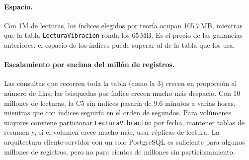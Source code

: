 \paragraph{Espacio.}
Con 1M de lecturas, los índices elegidos por teoría ocupan 105.7\,MB, mientras
que la tabla \texttt{LecturaVibracion} ronda los 65\,MB. Es el precio de las
ganancias anteriores: el espacio de los índices puede superar al de la tabla que
los usa.

\paragraph{Escalamiento por encima del millón de registros.}
Las consultas que recorren toda la tabla (como la 3) crecen en proporción al
número de filas; las búsquedas por índice crecen mucho más despacio. Con 10
millones de lecturas, la C5 sin índices pasaría de 9.6 minutos a varias horas,
mientras que con índices seguiría en el orden de segundos. Para volúmenes
mayores conviene particionar \texttt{LecturaVibracion} por fecha, mantener
tablas de resumen y, si el volumen crece mucho más, usar réplicas de lectura.
La arquitectura cliente-servidor con un solo PostgreSQL es suficiente para
algunos millones de registros, pero no para cientos de millones sin
particionamiento.
